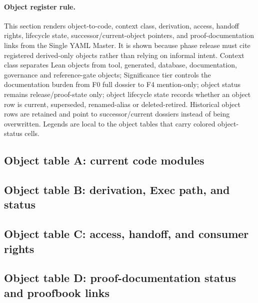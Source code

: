 \paragraph{Object register rule.} This section renders object-to-code, context class, derivation, access, handoff rights, lifecycle state, successor/current-object pointers, and proof-documentation links from the Single YAML Master. It is shown because phase release must cite registered derived-only objects rather than relying on informal intent. Context class separates Lean objects from tool, generated, database, documentation, governance and reference-gate objects; Significance tier controls the documentation burden from F0 full dossier to F4 mention-only; object status remains release/proof-state only; object lifecycle state records whether an object row is current, superseded, renamed-alias or deleted-retired. Historical object rows are retained and point to successor/current dossiers instead of being overwritten. Legends are local to the object tables that carry colored object-status cells.
\subsection*{Object table A: current code modules}

\subsection*{Object table B: derivation, Exec path, and status}

\subsection*{Object table C: access, handoff, and consumer rights}

\subsection*{Object table D: proof-documentation status and proofbook links}

